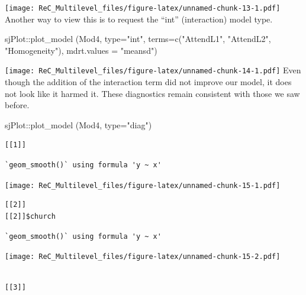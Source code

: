 \documentclass[
  11pt,
]{book}
\newenvironment{Shaded}{\begin{snugshade}}{\end{snugshade}}
\newcommand{\AttributeTok}[1]{\textcolor[rgb]{0.77,0.63,0.00}{#1}}
\newcommand{\FunctionTok}[1]{\textcolor[rgb]{0.00,0.00,0.00}{#1}}
\newcommand{\NormalTok}[1]{#1}
\newcommand{\SpecialCharTok}[1]{\textcolor[rgb]{0.00,0.00,0.00}{#1}}
\newcommand{\StringTok}[1]{\textcolor[rgb]{0.31,0.60,0.02}{#1}}
\begin{document}
\texttt{[image: ReC\_Multilevel\_files/figure-latex/unnamed-chunk-13-1.pdf]}
Another way to view this is to request the ``int'' (interaction) model type.

\begin{Shaded}
\begin{Highlighting}[]
\NormalTok{sjPlot}\SpecialCharTok{::}\FunctionTok{plot\_model}\NormalTok{ (Mod4, }\AttributeTok{type=}\StringTok{"int"}\NormalTok{, }\AttributeTok{terms=}\FunctionTok{c}\NormalTok{(}\StringTok{"AttendL1"}\NormalTok{, }\StringTok{"AttendL2"}\NormalTok{, }\StringTok{"Homogeneity"}\NormalTok{), }\AttributeTok{mdrt.values =} \StringTok{"meansd"}\NormalTok{)}
\end{Highlighting}
\end{Shaded}

\texttt{[image: ReC\_Multilevel\_files/figure-latex/unnamed-chunk-14-1.pdf]}
Even though the addition of the interaction term did not improve our model, it does not look like it harmed it. These diagnostics remain consistent with those we saw before.

\begin{Shaded}
\begin{Highlighting}[]
\NormalTok{sjPlot}\SpecialCharTok{::}\FunctionTok{plot\_model}\NormalTok{ (Mod4, }\AttributeTok{type=}\StringTok{"diag"}\NormalTok{)}
\end{Highlighting}
\end{Shaded}

\begin{verbatim}
[[1]]
\end{verbatim}

\begin{verbatim}
`geom_smooth()` using formula 'y ~ x'
\end{verbatim}

\texttt{[image: ReC\_Multilevel\_files/figure-latex/unnamed-chunk-15-1.pdf]}

\begin{verbatim}
[[2]]
[[2]]$church
\end{verbatim}

\begin{verbatim}
`geom_smooth()` using formula 'y ~ x'
\end{verbatim}

\texttt{[image: ReC\_Multilevel\_files/figure-latex/unnamed-chunk-15-2.pdf]}

\begin{verbatim}

[[3]]
\end{verbatim}
\end{document}
